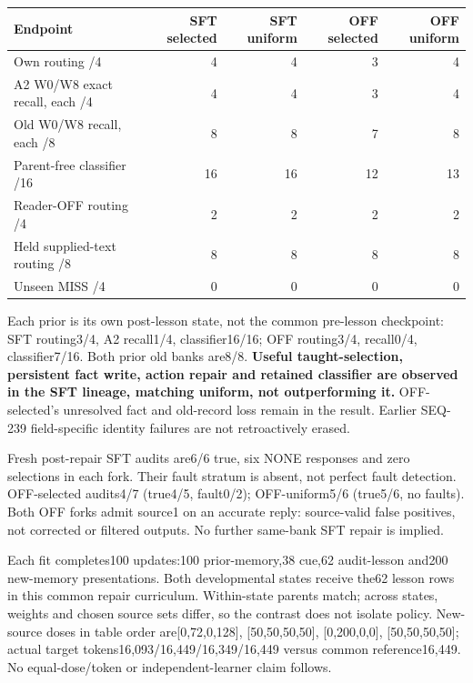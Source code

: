 \documentclass{article}
\begin{document}
\begin{center}
\small
\begin{tabular}{lrrrr}
\toprule
Endpoint & SFT selected & SFT uniform & OFF selected & OFF uniform \\
\midrule
Own routing /4 & 4 & 4 & 3 & 4 \\
A2 W0/W8 exact recall, each /4 & 4 & 4 & 3 & 4 \\
Old W0/W8 recall, each /8 & 8 & 8 & 7 & 8 \\
Parent-free classifier /16 & 16 & 16 & 12 & 13 \\
Reader-OFF routing /4 & 2 & 2 & 2 & 2 \\
Held supplied-text routing /8 & 8 & 8 & 8 & 8 \\
Unseen MISS /4 & 0 & 0 & 0 & 0 \\
\bottomrule
\end{tabular}
\end{center}

Each prior is its own post-lesson state, not the common pre-lesson checkpoint:
SFT routing3/4, A2 recall1/4, classifier16/16; OFF routing3/4, recall0/4,
classifier7/16. Both prior old banks are8/8. \textbf{Useful taught-selection,
persistent fact write, action repair and retained classifier are observed in
the SFT lineage, matching uniform, not outperforming it.} OFF-selected's
unresolved fact and old-record loss remain in the result. Earlier SEQ-239
field-specific identity failures are not retroactively erased.

Fresh post-repair SFT audits are6/6 true, six NONE responses and zero selections
in each fork. Their fault stratum is absent, not perfect fault detection.
OFF-selected audits4/7 (true4/5, fault0/2); OFF-uniform5/6 (true5/6, no faults).
Both OFF forks admit source1 on an accurate reply: source-valid false positives,
not corrected or filtered outputs. No further same-bank SFT repair is implied.

Each fit completes100 updates:100 prior-memory,38 cue,62 audit-lesson and200
new-memory presentations. Both developmental states receive the62 lesson rows
in this common repair curriculum. Within-state parents match; across states,
weights and chosen source sets differ, so the contrast does not isolate policy.
New-source doses in table order are[0,72,0,128], [50,50,50,50], [0,200,0,0],
[50,50,50,50]; actual target tokens16,093/16,449/16,349/16,449 versus common
reference16,449. No equal-dose/token or independent-learner claim follows.
\end{document}
